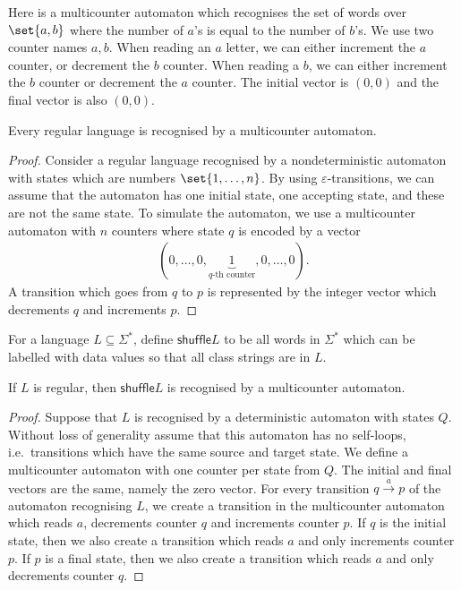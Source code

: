 \begin{myexample}
Here is a multicounter automaton which recognises the set of words over $\set{a,b}$ where the number of $a$'s is equal to the number of $b$'s. We use two counter names $a,b$. When reading an $a$ letter, we can either increment the $a$ counter, or decrement the $b$ counter. When reading a $b$, we can either increment the $b$ counter or decrement the $a$ counter. The initial vector is $(0,0)$ and the final vector is also $(0,0)$.
\end{myexample}

\begin{lemma}\label{lem:mulitcounter-do-regular}
Every regular language is recognised by a multicounter automaton.
\end{lemma}
\begin{proof}
Consider a regular language recognised by a nondeterministic automaton with states which are numbers $\set{1,\ldots,n}$. By using $\varepsilon$-transitions, we can assume that the automaton has one initial state, one accepting state, and these are not the same state. To simulate the automaton, we use a multicounter automaton with $n$ counters where state $q$ is encoded by a vector
\begin{align*}
 (0,\ldots,0,\underbrace{1}_{\text{$q$-th counter}},0,\ldots,0).
\end{align*}
A transition which goes from $q$ to $p$ is represented by the integer vector which decrements $q$ and increments $p$. 	
\end{proof}







For a language $L \subseteq \Sigma^*$, define $\mathsf{shuffle}L$ to be all words in $\Sigma^*$ which can be labelled with data values so that all class strings are in $L$. 

\begin{lemma}\label{lem:shuffle}
If $L$ is regular, then $\mathsf{shuffle}L$ is recognised by a multicounter automaton.
\end{lemma}
\begin{proof}Suppose that $L$ is recognised by a deterministic automaton with states $Q$. Without loss of generality assume that this automaton has no self-loops, i.e.~transitions which have the same source and target state. We define a multicounter automaton with one counter per state from $Q$. The initial and final vectors are the same, namely the zero vector. For every transition $q \stackrel a \to p$ of the automaton recognising $L$, we create a transition in the multicounter automaton which reads $a$, decrements counter $q$ and increments counter $p$. If $q$ is the initial state, then we also create a transition which reads $a$ and only increments counter $p$. If $p$ is a final state, then we also create a transition which reads $a$ and only decrements counter $q$. \end{proof}

